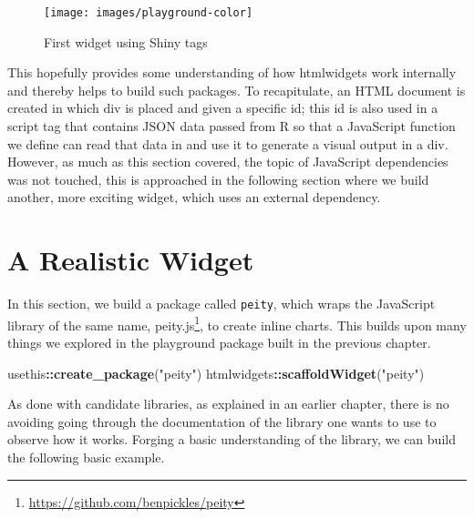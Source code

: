 \documentclass[10pt,]{krantz}
\makeatletter
\newenvironment{Shaded}{\begin{snugshade}}{\end{snugshade}}
\newcommand{\KeywordTok}[1]{\textcolor[rgb]{0.27,0.27,0.27}{\textbf{#1}}}
\newcommand{\NormalTok}[1]{#1}
\newcommand{\OperatorTok}[1]{\textcolor[rgb]{0.43,0.43,0.43}{\textbf{#1}}}
\newcommand{\StringTok}[1]{\textcolor[rgb]{0.5,0.5,0.5}{#1}}
\renewcommand{\href}[2]{#2\footnote{\url{#1}}}
\newenvironment{kframe}{%
\medskip{}
\setlength{\fboxsep}{.8em}
 \def\at@end@of@kframe{}%
 \ifinner\ifhmode%
  \def\at@end@of@kframe{\end{minipage}}%
  \begin{minipage}{\columnwidth}%
 \fi\fi%
 \def\FrameCommand##1{\hskip\@totalleftmargin \hskip-\fboxsep
 \colorbox{shadecolor}{##1}\hskip-\fboxsep
     \hskip-\linewidth \hskip-\@totalleftmargin \hskip\columnwidth}%
 \MakeFramed {\advance\hsize-\width
   \@totalleftmargin\z@ \linewidth\hsize
   \@setminipage}}%
 {\par\unskip\endMakeFramed%
 \at@end@of@kframe}
\renewenvironment{Shaded}{\begin{kframe}}{\end{kframe}}
\makeatother
\begin{document}
\begin{figure}[H]

{\centering \texttt{[image: images/playground-color]} 

}

\caption{First widget using Shiny tags}\label{fig:playground-tags}
\end{figure}

This hopefully provides some understanding of how htmlwidgets work internally and thereby helps to build such packages. To recapitulate, an HTML document is created in which div is placed and given a specific id; this id is also used in a script tag that contains JSON data passed from R so that a JavaScript function we define can read that data in and use it to generate a visual output in a div. However, as much as this section covered, the topic of JavaScript dependencies was not touched, this is approached in the following section where we build another, more exciting widget, which uses an external dependency.

\hypertarget{widgets-realistic}{%
\chapter{A Realistic Widget}\label{widgets-realistic}}

In this section, we build a package called \texttt{peity}, which wraps the JavaScript library of the same name, \href{https://github.com/benpickles/peity}{peity.js}, to create inline charts. This builds upon many things we explored in the playground package built in the previous chapter.

\begin{Shaded}
\begin{Highlighting}[]
\NormalTok{usethis}\OperatorTok{::}\KeywordTok{create_package}\NormalTok{(}\StringTok{"peity"}\NormalTok{)}
\NormalTok{htmlwidgets}\OperatorTok{::}\KeywordTok{scaffoldWidget}\NormalTok{(}\StringTok{"peity"}\NormalTok{)}
\end{Highlighting}
\end{Shaded}

As done with candidate libraries, as explained in an earlier chapter, there is no avoiding going through the documentation of the library one wants to use to observe how it works. Forging a basic understanding of the library, we can build the following basic example.
\end{document}
